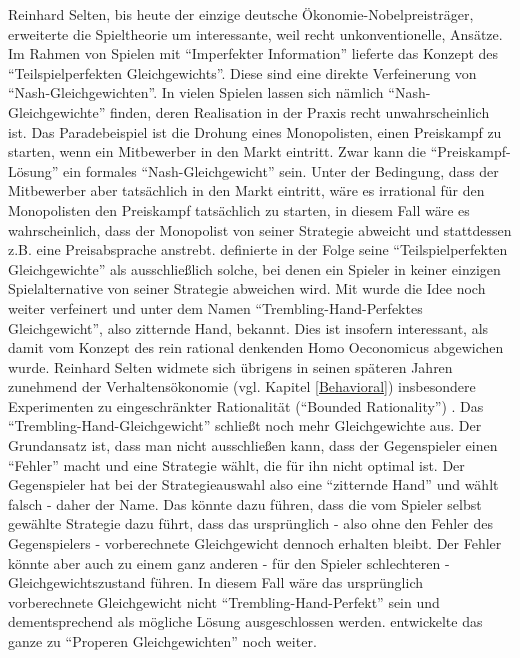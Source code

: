 Reinhard Selten, bis heute der einzige deutsche Ökonomie-Nobelpreisträger, erweiterte die Spieltheorie um interessante, weil recht unkonventionelle, Ansätze. Im Rahmen von Spielen mit "`Imperfekter Information"' lieferte \textcite{Selten1965} das Konzept des "`Teilspielperfekten Gleichgewichts"'. Diese sind eine direkte Verfeinerung von "`Nash-Gleichgewichten"'. In vielen Spielen lassen sich nämlich "`Nash-Gleichgewichte"' finden, deren Realisation in der Praxis recht unwahrscheinlich ist. Das Paradebeispiel ist die Drohung eines Monopolisten, einen Preiskampf zu starten, wenn ein Mitbewerber in den Markt eintritt. Zwar kann die "`Preiskampf-Lösung"' ein formales "`Nash-Gleichgewicht"' sein. Unter der Bedingung, dass der Mitbewerber aber tatsächlich in den Markt eintritt, wäre es irrational für den Monopolisten den Preiskampf tatsächlich zu starten, in diesem Fall wäre es wahrscheinlich, dass der Monopolist von seiner Strategie abweicht und stattdessen z.B. eine Preisabsprache anstrebt. \textcite{Selten1965} definierte in der Folge seine "`Teilspielperfekten Gleichgewichte"' als ausschließlich solche, bei denen ein Spieler in keiner einzigen Spielalternative von seiner Strategie abweichen wird. Mit \textcite{Selten1975} wurde die Idee noch weiter verfeinert und unter dem Namen "`Trembling-Hand-Perfektes Gleichgewicht"', also zitternde Hand, bekannt. Dies ist insofern interessant, als damit vom Konzept des rein rational denkenden Homo Oeconomicus abgewichen wurde. Reinhard Selten widmete sich übrigens in seinen späteren Jahren zunehmend der Verhaltensökonomie (vgl. Kapitel \ref{Behavioral}) insbesondere Experimenten zu eingeschränkter Rationalität ("`Bounded Rationality"') \parencite{Gigerenzer2002}. Das "`Trembling-Hand-Gleichgewicht"' schließt noch mehr Gleichgewichte aus. Der Grundansatz ist, dass man nicht ausschließen kann, dass der Gegenspieler einen "`Fehler"' macht und eine Strategie wählt, die für ihn nicht optimal ist. Der Gegenspieler hat bei der Strategieauswahl also eine "`zitternde Hand"' und wählt falsch - daher der Name. Das könnte dazu führen, dass die vom Spieler selbst gewählte Strategie dazu führt, dass das ursprünglich - also ohne den Fehler des Gegenspielers - vorberechnete Gleichgewicht dennoch erhalten bleibt. Der Fehler könnte aber auch zu einem ganz anderen - für den Spieler schlechteren - Gleichgewichtszustand führen. In diesem Fall wäre das ursprünglich vorberechnete Gleichgewicht nicht "`Trembling-Hand-Perfekt"' sein und dementsprechend als mögliche Lösung ausgeschlossen werden. \textcite{Myerson1978} entwickelte das ganze zu "`Properen Gleichgewichten"' noch weiter.

